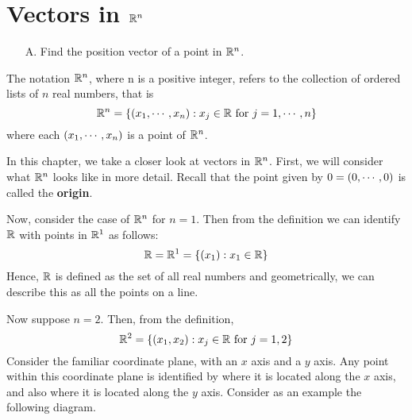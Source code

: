 \section{Vectors in $\mathbb{R}^n$}

\begin{outcome}

\begin{enumerate}
\item[A.] Find the position vector of a point in $\mathbb{R}^n$.
\end{enumerate}
\end{outcome}

The notation $\mathbb{R}^{n}$, where n is a positive integer, refers to the collection of ordered lists of 
$n$ real numbers, that is 
\[
\mathbb{R}^{n} = \left\{\left(x_{1},\cdots, x_{n}\right)
:x_{j}\in \mathbb{R}\mbox{ for }j=1,\cdots ,n\right\}
\]
where each $\left(x_{1},\cdots, x_{n}\right)$ is a point of $\mathbb{R}^n$.

In this chapter, we take a closer look at vectors in $\mathbb{R}^n$. First, we will consider what $\mathbb{R}^n$ looks like 
in more detail. Recall that the point given by $0=\left(0, \cdots, 0 \right)$ is called the \textbf{origin}.

Now, consider the case of $\mathbb{R}^n$ for $n=1.$ Then from the definition we can identify 
$\mathbb{R}$ with points in $\mathbb{R}^{1}$ as follows:
\begin{equation*}
\mathbb{R} = \mathbb{R}^{1}=
 \left\{\left(x_{1}\right) :x_{1}\in \mathbb{R} \right\}
\end{equation*}
Hence, $\mathbb{R}$ is defined as the set of all real numbers and geometrically,
we can describe this as all the points on a line.

Now suppose $n=2$. Then, from the definition,
\begin{equation*}
\mathbb{R}^{2}=
\left\{\left(x_{1}, x_{2}\right)
:x_{j}\in \mathbb{R}\mbox{ for }j=1,2 \right\}
\end{equation*}
Consider the
familiar coordinate plane, with an $x$ axis and a $y$ axis. Any point
within this coordinate plane is identified by where it is located
along the $x$ axis, and also where it is located along the $y$
axis. Consider as an example the following diagram.

\begin{center}
\end{center}

